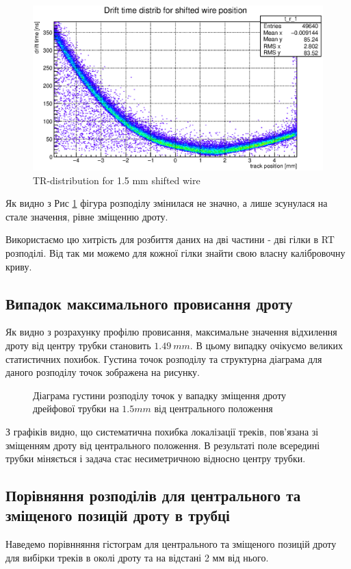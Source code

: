 \documentclass[]{article}
\begin{document}
	\begin{figure}
		\centering
		\includegraphics[width = \textwidth]{tr_distr_15.eps}
		\caption{TR-distribution for 1.5 mm shifted wire}
		\label{fig:tr_distr_15}
	\end{figure}
	
	Як видно з Рис \ref{fig:tr_distr_15} фігура розподілу змінилася не значно, а лише зсунулася на стале значення, рівне зміщенню дроту.
	
	Використаємо цю хитрість для розбиття даних на дві частини - дві гілки в RT розподілі. Від так ми можемо для  кожної гілки знайти свою власну калібровочну криву.
	
	
	\subsection{ Випадок максимального провисання дроту}
	Як видно з розрахунку профілю провисання, максимальне значення відхилення дроту від центру трубки становить $1.49~mm$. В цьому випадку очікуємо великих статистичних похибок. Густина точок розподілу та структурна діаграма для даного розподілу точок зображена на рисунку.
	
	\begin{figure}[h!]
	\centering
	\caption{ Діаграма густини розподілу точок у вападку зміщення дроту дрейфової трубки на $1.5 mm$ від центрального положення}
	\end{figure}
	
	З графіків видно, що систематична похибка локалізації треків, пов’язана зі зміщенням дроту від центрального положення.
	В результаті поле всередині трубки міняється і задача стає несиметричною відносно центру трубки.
	
	\subsection{ Порівняння розподілів для центрального та зміщеного позицій дроту в трубці}	
	Наведемо порівнняння гістограм для центрального та зміщеного позицій дроту для вибірки треків в околі дроту та на відстані 2 мм від нього.
	
\end{document}
